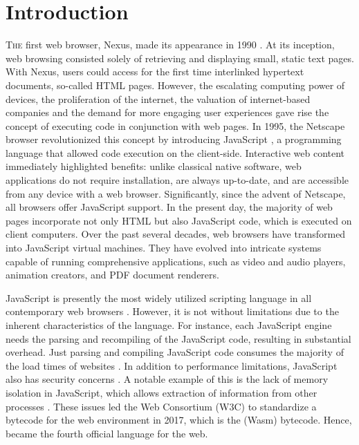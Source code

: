 
\chapter{Introduction}
\label{Intro}


\lettrine[lines=3]{T}{he} first web browser, Nexus, made its appearance in 1990 \cite{nexus}.  
At its inception, web browsing consisted solely of retrieving and displaying small, static text pages. 
With Nexus, users could access for the first time interlinked hypertext documents, so-called HTML pages. 
However, the escalating computing power of devices, the proliferation of the internet, the valuation of internet-based companies and the demand for more engaging user experiences gave rise the concept of executing code in conjunction with web pages. 
In 1995, the Netscape browser revolutionized this concept by introducing JavaScript \cite{10.1007/978-3-642-14107-2_7}, a programming language that allowed code execution on the client-side.
Interactive web content immediately highlighted benefits: unlike classical native software, web applications do not require installation, are always up-to-date, and are accessible from any device with a web browser. 
Significantly, since the advent of Netscape, all browsers offer JavaScript support. 
In the present day, the majority of web pages incorporate not only HTML but also JavaScript code, which is executed on client computers. 
Over the past several decades, web browsers have transformed into JavaScript virtual machines. 
They have evolved into intricate systems capable of running comprehensive applications, such as video and audio players, animation creators, and PDF document renderers.

JavaScript is presently the most widely utilized scripting language in all contemporary web browsers \cite{mulazzani2013fast}.
However, it is not without limitations due to the inherent characteristics of the language.
For instance, each JavaScript engine needs the parsing and recompiling of the JavaScript code, resulting in substantial overhead.
Just parsing and compiling JavaScript code consumes the majority of the load times of websites \cite{clark}.
In addition to performance limitations, JavaScript also has security concerns \cite{10.1145/1190216.1190252}.
A notable example of this is the lack of memory isolation in JavaScript, which allows extraction of information from other processes \cite{10.1145/3412841.3442001}.
These issues led the Web Consortium (W3C) to standardize a bytecode for the web environment in 2017, which is the \Wasm(Wasm) bytecode.
Hence, \Wasm became the fourth official language for the web.



